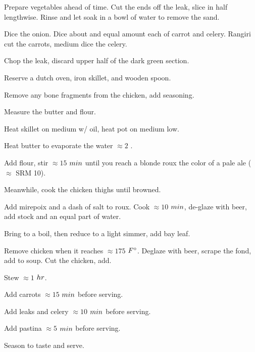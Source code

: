 \begin{preparation}
\item Prepare vegetables ahead of time.
    Cut the ends off the leak, slice in half lengthwise.
    Rinse and let soak in a bowl of water to remove the sand.

\item Dice the onion.
    Dice about and equal amount each of carrot and celery.
    Rangiri cut the carrots, medium dice the celery.

\item Chop the leak, discard upper half of the dark green section.


\item Reserve a dutch oven, iron skillet, and wooden spoon.

\item Remove any bone fragments from the chicken, add seasoning.

\item Measure the butter and flour.

\item Heat skillet on medium w/ oil, heat pot on medium low.

\item Heat butter to evaporate the water $\approx2$ \minute.

\item Add flour, stir $\approx 15$ $\minute$ until you reach a blonde roux the color of a pale ale ($\approx$ SRM 10).

\item Meanwhile, cook the chicken thighs until browned.

\item Add mirepoix and a dash of salt to roux.
    Cook $\approx 10$ $\minute$, de-glaze with beer, add stock and an equal part of water.

\item Bring to a boil, then reduce to a light simmer, add bay leaf.

\item Remove chicken when it reaches $\approx 175$ $\Fahrenheit$.
    Deglaze with beer, scrape the fond, add to soup.
    Cut the chicken, add.

\item Stew $\approx 1$ $\hour$.

\item Add carrots $\approx 15$ $\minute$ before serving.

\item Add leaks and celery $\approx 10$ $\minute$ before serving.

\item Add pastina $\approx 5$ $\minute$ before serving.

\item Season to taste and serve.
\end{preparation}

\recipeend%
